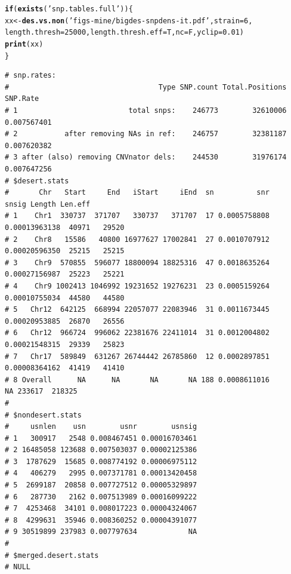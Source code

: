 \documentclass{article}\usepackage[]{graphicx}\usepackage[]{color}
\makeatletter
\newcommand{\hlnum}[1]{\textcolor[rgb]{0.686,0.059,0.569}{#1}}%
\newcommand{\hlstr}[1]{\textcolor[rgb]{0.192,0.494,0.8}{#1}}%
\newcommand{\hlstd}[1]{\textcolor[rgb]{0.345,0.345,0.345}{#1}}%
\newcommand{\hlkwa}[1]{\textcolor[rgb]{0.161,0.373,0.58}{\textbf{#1}}}%
\newcommand{\hlkwb}[1]{\textcolor[rgb]{0.69,0.353,0.396}{#1}}%
\newcommand{\hlkwc}[1]{\textcolor[rgb]{0.333,0.667,0.333}{#1}}%
\newcommand{\hlkwd}[1]{\textcolor[rgb]{0.737,0.353,0.396}{\textbf{#1}}}%
\newenvironment{kframe}{%
 \def\at@end@of@kframe{}%
 \ifinner\ifhmode%
  \def\at@end@of@kframe{\end{minipage}}%
  \begin{minipage}{\columnwidth}%
 \fi\fi%
 \def\FrameCommand##1{\hskip\@totalleftmargin \hskip-\fboxsep
 \colorbox{shadecolor}{##1}\hskip-\fboxsep
     \hskip-\linewidth \hskip-\@totalleftmargin \hskip\columnwidth}%
 \MakeFramed {\advance\hsize-\width
   \@totalleftmargin\z@ \linewidth\hsize
   \@setminipage}}%
 {\par\unskip\endMakeFramed%
 \at@end@of@kframe}
\newenvironment{knitrout}{}{} %
\makeatother
\begin{document}
\begin{knitrout}\footnotesize
{}\color{fgcolor}\begin{kframe}
\begin{alltt}
\hlkwa{if}\hlstd{(}\hlkwd{exists}\hlstd{(}\hlstr{'snp.tables.full'}\hlstd{))\{}
  \hlstd{xx} \hlkwb{<-} \hlkwd{des.vs.non}\hlstd{(}\hlstr{'figs-mine/bigdes-snpdens-it.pdf'}\hlstd{,} \hlkwc{strain}\hlstd{=}\hlnum{6}\hlstd{,}
                   \hlkwc{length.thresh}\hlstd{=}\hlnum{25000}\hlstd{,} \hlkwc{length.thresh.eff}\hlstd{=T,} \hlkwc{nc}\hlstd{=F,} \hlkwc{yclip}\hlstd{=}\hlnum{0.01}\hlstd{)}
  \hlkwd{print}\hlstd{(xx)}
\hlstd{\}}
\end{alltt}
\begin{verbatim}
# snp.rates:
#                                   Type SNP.count Total.Positions    SNP.Rate
# 1                          total snps:    246773        32610006 0.007567401
# 2           after removing NAs in ref:    246757        32381187 0.007620382
# 3 after (also) removing CNVnator dels:    244530        31976174 0.007647256
# $desert.stats
#       Chr   Start     End   iStart     iEnd  sn          snr         snsig Length Len.eff
# 1    Chr1  330737  371707   330737   371707  17 0.0005758808 0.00013963138  40971   29520
# 2    Chr8   15586   40800 16977627 17002841  27 0.0010707912 0.00020596350  25215   25215
# 3    Chr9  570855  596077 18800094 18825316  47 0.0018635264 0.00027156987  25223   25221
# 4    Chr9 1002413 1046992 19231652 19276231  23 0.0005159264 0.00010755034  44580   44580
# 5   Chr12  642125  668994 22057077 22083946  31 0.0011673445 0.00020953885  26870   26556
# 6   Chr12  966724  996062 22381676 22411014  31 0.0012004802 0.00021548315  29339   25823
# 7   Chr17  589849  631267 26744442 26785860  12 0.0002897851 0.00008364162  41419   41410
# 8 Overall      NA      NA       NA       NA 188 0.0008611016            NA 233617  218325
# 
# $nondesert.stats
#     usnlen    usn        usnr        usnsig
# 1   300917   2548 0.008467451 0.00016703461
# 2 16485058 123688 0.007503037 0.00002125386
# 3  1787629  15685 0.008774192 0.00006975112
# 4   406279   2995 0.007371781 0.00013420458
# 5  2699187  20858 0.007727512 0.00005329897
# 6   287730   2162 0.007513989 0.00016099222
# 7  4253468  34101 0.008017223 0.00004324067
# 8  4299631  35946 0.008360252 0.00004391077
# 9 30519899 237983 0.007797634            NA
# 
# $merged.desert.stats
# NULL
\end{verbatim}
\end{kframe}
\end{knitrout}
\end{document}
